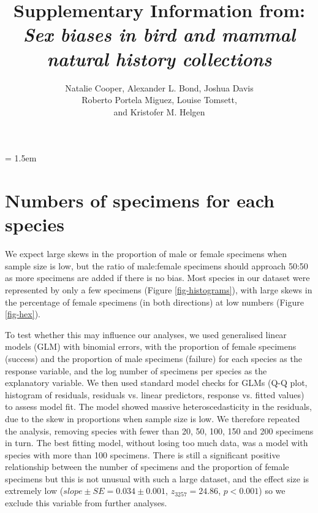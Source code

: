\documentclass[a4paper, 12pt]{article}
\title{Supplementary Information from: \textit{Sex biases in bird and mammal natural history collections}}
\author{Natalie Cooper, 
  Alexander L. Bond,
  Joshua Davis\\
  Roberto Portela Miguez,
  Louise Tomsett, \\ and
  Kristofer M. Helgen}
\date{}
\begin{document}
\maketitle

\tableofcontents

\parindent = 1.5em
\addtolength{\parskip}{.3em}


\newpage
\section{Numbers of specimens for each species}

We expect large skews in the proportion of male or female specimens when sample size is low, but the ratio of male:female specimens should approach 50:50 as more specimens are added if there is no bias. 
Most species in our dataset were represented by only a few specimens (Figure \ref{fig-histograms}), with large skews in the percentage of female specimens (in both directions) at low numbers (Figure \ref{fig-hex}).

To test whether this may influence our analyses, we used generalised linear models (GLM) with binomial errors, with the proportion of female specimens (success) and the proportion of male specimens (failure) for each species as the response variable, and the log number of specimens per species as the explanatory variable. 
We then used standard model checks for GLMs (Q-Q plot, histogram of residuals, residuals vs. linear predictors, response vs. fitted values) to assess model fit. 
The model showed massive heteroscedasticity in the residuals, due to the skew in proportions when sample size is low. 
We therefore repeated the analysis, removing species with fewer than 20, 50, 100, 150 and 200 specimens in turn. 
The best fitting model, without losing too much data, was a model with species with more than 100 specimens. 
There is still a significant positive relationship between the number of specimens and the proportion of female specimens but this is not unusual with such a large dataset, and the effect size is extremely low ($slope \pm SE = 0.034 \pm 0.001$, $z_3257 = 24.86$, $p < 0.001$) so we exclude this variable from further analyses.
\end{document}
